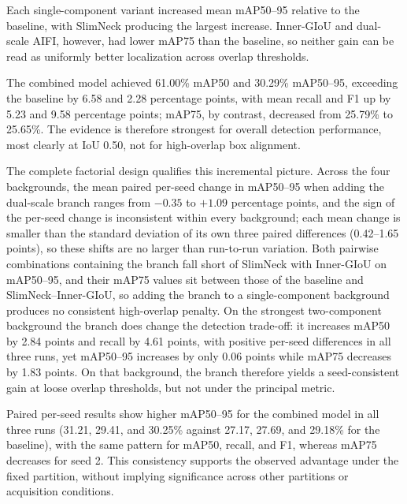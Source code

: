 \documentclass[pdflatex,sn-mathphys-num,iicol]{sn-jnl}
\begin{document}
Each single-component variant increased mean mAP50--95 relative to the baseline, with SlimNeck producing the largest increase. Inner-GIoU and dual-scale AIFI, however, had lower mAP75 than the baseline, so neither gain can be read as uniformly better localization across overlap thresholds.

The combined model achieved 61.00\% mAP50 and 30.29\% mAP50--95, exceeding the baseline by 6.58 and 2.28 percentage points, with mean recall and F1 up by 5.23 and 9.58 percentage points; mAP75, by contrast, decreased from 25.79\% to 25.65\%. The evidence is therefore strongest for overall detection performance, most clearly at IoU 0.50, not for high-overlap box alignment.

The complete factorial design qualifies this incremental picture. Across the four backgrounds, the mean paired per-seed change in mAP50--95 when adding the dual-scale branch ranges from $-0.35$ to $+1.09$ percentage points, and the sign of the per-seed change is inconsistent within every background; each mean change is smaller than the standard deviation of its own three paired differences (0.42--1.65 points), so these shifts are no larger than run-to-run variation. Both pairwise combinations containing the branch fall short of SlimNeck with Inner-GIoU on mAP50--95, and their mAP75 values sit between those of the baseline and SlimNeck--Inner-GIoU, so adding the branch to a single-component background produces no consistent high-overlap penalty. On the strongest two-component background the branch does change the detection trade-off: it increases mAP50 by 2.84 points and recall by 4.61 points, with positive per-seed differences in all three runs, yet mAP50--95 increases by only 0.06 points while mAP75 decreases by 1.83 points. On that background, the branch therefore yields a seed-consistent gain at loose overlap thresholds, but not under the principal metric.

Paired per-seed results show higher mAP50--95 for the combined model in all three runs (31.21, 29.41, and 30.25\% against 27.17, 27.69, and 29.18\% for the baseline), with the same pattern for mAP50, recall, and F1, whereas mAP75 decreases for seed 2. This consistency supports the observed advantage under the fixed partition, without implying significance across other partitions or acquisition conditions.
\end{document}
